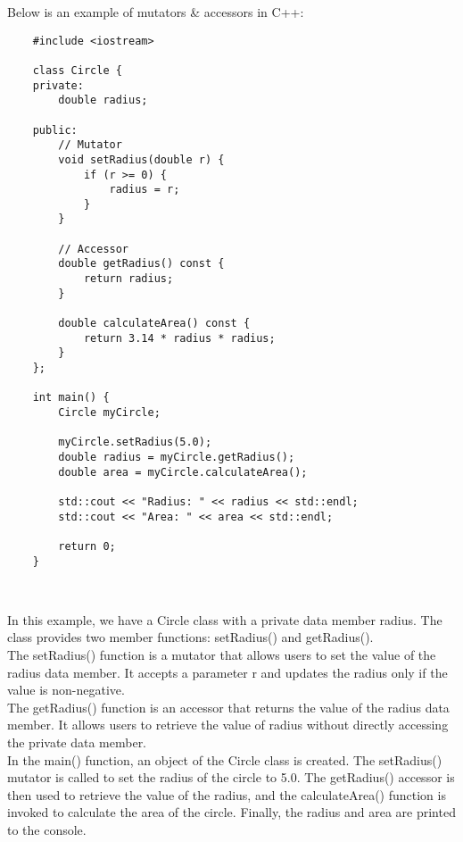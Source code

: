 \begin{solution}
    Below is an example of mutators \& accessors in C++: \\
    \horizontalline
    \begin{verbatim}
    #include <iostream>

    class Circle {
    private:
        double radius;
        
    public:
        // Mutator
        void setRadius(double r) {
            if (r >= 0) {
                radius = r;
            }
        }
        
        // Accessor
        double getRadius() const {
            return radius;
        }
        
        double calculateArea() const {
            return 3.14 * radius * radius;
        }
    };
    
    int main() {
        Circle myCircle;
        
        myCircle.setRadius(5.0);
        double radius = myCircle.getRadius();
        double area = myCircle.calculateArea();
        
        std::cout << "Radius: " << radius << std::endl;
        std::cout << "Area: " << area << std::endl;
        
        return 0;
    }        
    \end{verbatim} \\
    \horizontalline

    In this example, we have a Circle class with a private data member radius. The class provides two member functions: setRadius() and getRadius(). \\

    \noindent The setRadius() function is a mutator that allows users to set the value of the radius data member. It accepts a parameter r and updates the radius only if the value is non-negative. \\

    \noindent The getRadius() function is an accessor that returns the value of the radius data member. It allows users to retrieve the value of radius without directly accessing the private data member. \\

    \noindent In the main() function, an object of the Circle class is created. The setRadius() mutator is called to set the radius of the circle to 5.0. The getRadius() accessor is then used to retrieve the value of the 
    radius, and the calculateArea() function is invoked to calculate the area of the circle. Finally, the radius and area are printed to the console. \\


\end{solution}
